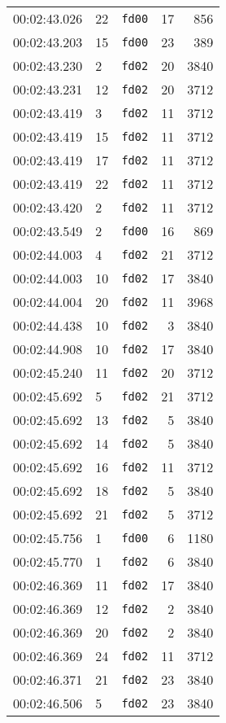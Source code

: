 \documentclass{article}
\begin{document}
\begin{longtable}{lllrr}
00:02:43.026 & 22 & \texttt{fd00} & 17 & 856 \\
00:02:43.203 & 15 & \texttt{fd00} & 23 & 389 \\
00:02:43.230 & 2 & \texttt{fd02} & 20 & 3840 \\
00:02:43.231 & 12 & \texttt{fd02} & 20 & 3712 \\
00:02:43.419 & 3 & \texttt{fd02} & 11 & 3712 \\
00:02:43.419 & 15 & \texttt{fd02} & 11 & 3712 \\
00:02:43.419 & 17 & \texttt{fd02} & 11 & 3712 \\
00:02:43.419 & 22 & \texttt{fd02} & 11 & 3712 \\
00:02:43.420 & 2 & \texttt{fd02} & 11 & 3712 \\
00:02:43.549 & 2 & \texttt{fd00} & 16 & 869 \\
00:02:44.003 & 4 & \texttt{fd02} & 21 & 3712 \\
00:02:44.003 & 10 & \texttt{fd02} & 17 & 3840 \\
00:02:44.004 & 20 & \texttt{fd02} & 11 & 3968 \\
00:02:44.438 & 10 & \texttt{fd02} & 3 & 3840 \\
00:02:44.908 & 10 & \texttt{fd02} & 17 & 3840 \\
00:02:45.240 & 11 & \texttt{fd02} & 20 & 3712 \\
00:02:45.692 & 5 & \texttt{fd02} & 21 & 3712 \\
00:02:45.692 & 13 & \texttt{fd02} & 5 & 3840 \\
00:02:45.692 & 14 & \texttt{fd02} & 5 & 3840 \\
00:02:45.692 & 16 & \texttt{fd02} & 11 & 3712 \\
00:02:45.692 & 18 & \texttt{fd02} & 5 & 3840 \\
00:02:45.692 & 21 & \texttt{fd02} & 5 & 3712 \\
00:02:45.756 & 1 & \texttt{fd00} & 6 & 1180 \\
00:02:45.770 & 1 & \texttt{fd02} & 6 & 3840 \\
00:02:46.369 & 11 & \texttt{fd02} & 17 & 3840 \\
00:02:46.369 & 12 & \texttt{fd02} & 2 & 3840 \\
00:02:46.369 & 20 & \texttt{fd02} & 2 & 3840 \\
00:02:46.369 & 24 & \texttt{fd02} & 11 & 3712 \\
00:02:46.371 & 21 & \texttt{fd02} & 23 & 3840 \\
00:02:46.506 & 5 & \texttt{fd02} & 23 & 3840 \\

\end{longtable}
\end{document}
